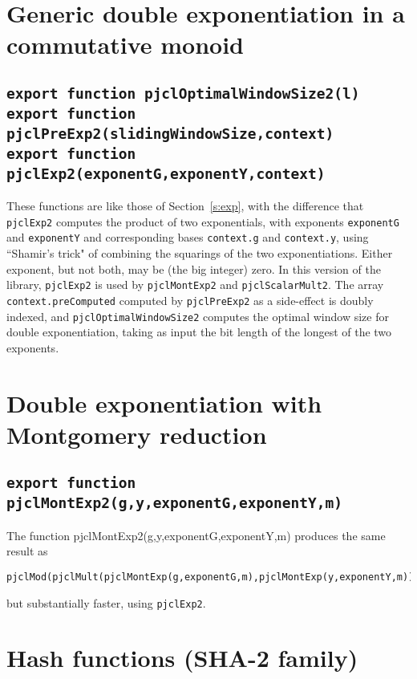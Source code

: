 \documentclass[12pt]{article}
\begin{document}
\section{Generic double exponentiation in a commutative monoid}

\subsection{\tt export function pjclOptimalWindowSize2(l)\\export function pjclPreExp2(slidingWindowSize,context)\\export function pjclExp2(exponentG,exponentY,context)}
These functions are like those of Section~\ref{s:exp}, with the difference that {\tt pjclExp2} computes the product of two exponentials, with exponents {\tt exponentG} and {\tt exponentY} and corresponding bases {\tt context.g} and {\tt context.y}, using ``Shamir's trick"
of combining the squarings of the two exponentiations.  
Either exponent, but not both, may be (the big integer) zero.
In this version of the library,
{\tt pjclExp2} is used by {\tt pjclMontExp2} and {\tt pjclScalarMult2}.  The array {\tt context.preComputed} computed by {\tt pjclPreExp2} as a side-effect
is doubly indexed, and {\tt pjclOptimalWindowSize2} computes the optimal window size for double exponentiation, taking as input the bit length of the longest of the two exponents.

\section{Double exponentiation with Montgomery reduction}

\subsection
[\tt export function pjclMontExp2(\\\mbox{}\hspace{.2in}g,y,exponentG,exponentY,m)]
{\tt export function pjclMontExp2(g,y,exponentG,exponentY,m)}

The function pjclMontExp2(g,y,exponentG,exponentY,m) produces the
same result as
\begin{verbatim}
pjclMod(pjclMult(pjclMontExp(g,exponentG,m),pjclMontExp(y,exponentY,m)),m)
\end{verbatim}
but substantially faster, using {\tt pjclExp2}.

\section{Hash functions (SHA-2 family)}
\end{document}
